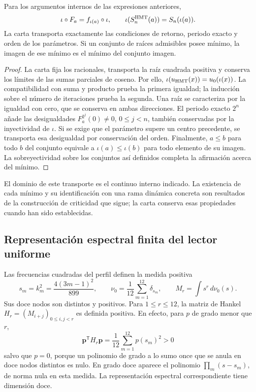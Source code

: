 \begin{proposition}
\label{hmtfg:conjugacion-selector}
Para los argumentos internos de las expresiones anteriores,
\[
 \iota\circ F_a=f_{\iota(a)}\circ\iota,\qquad
 \iota(S_n^{\rm HMT}(a))=S_n(\iota(a)).
\]
La carta transporta exactamente las condiciones de retorno, periodo
exacto y orden de los parámetros. Si un conjunto de raíces admisibles
posee mínimo, la imagen de ese mínimo es el mínimo del conjunto imagen.
\end{proposition}
\begin{proof}
La carta fija los racionales, transporta la raíz cuadrada positiva y
conserva los límites de las sumas parciales de coseno. Por ello,
\(\iota(u_{\rm HMT}(x))=u_0(\iota(x))\). La compatibilidad con
suma y producto prueba la primera igualdad; la inducción sobre el
número de iteraciones prueba la segunda. Una raíz se caracteriza por
la igualdad con cero, que se conserva en ambas direcciones. El
periodo exacto \(2^n\) añade las desigualdades
\(F_a^{2^j}(0)\ne0\), \(0\le j<n\), también conservadas por la
inyectividad de \(\iota\). Si se exige que el parámetro supere un
centro precedente, se transporta esa desigualdad por conservación
del orden. Finalmente, \(a\le b\) para todo \(b\) del conjunto
equivale a \(\iota(a)\le\iota(b)\) para todo elemento de su
imagen. La sobreyectividad sobre los conjuntos así definidos
completa la afirmación acerca del mínimo.
\end{proof}

El dominio de este transporte es el continuo interno indicado.
La existencia de cada mínimo y su identificación con una rama dinámica
concreta son resultados de la construcción de criticidad que sigue;
la carta conserva esas propiedades cuando han sido establecidas.

\subsection{Representación espectral finita del lector uniforme}
\label{hmtfg:jacobi-finito}

Las frecuencias cuadradas del perfil definen la medida positiva
\[
 s_m=k_m^2=\frac{4(3m-1)^2}{899},\qquad
 \nu_0=\frac1{12}\sum_{m=1}^{12}\delta_{s_m},\qquad
 M_r=\int s^r\,d\nu_0(s).
\]
Sus doce nodos son distintos y positivos. Para \(1\le r\le12\),
la matriz de Hankel \(H_r=(M_{i+j})_{0\le i,j<r}\) es definida
positiva. En efecto, para \(p\) de grado menor que \(r\),
\[
 \mathbf p^{\mathsf T}H_r\mathbf p
   =\frac1{12}\sum_{m=1}^{12}p(s_m)^2>0
\]
salvo que \(p=0\), porque un polinomio de grado a lo sumo once
que se anula en doce nodos distintos es nulo. En grado doce aparece
el polinomio \(\prod_m(s-s_m)\), de norma nula en esta medida.
La representación espectral correspondiente tiene dimensión doce.

